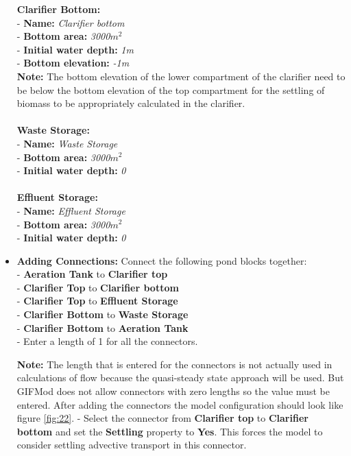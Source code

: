 \begin{itemize}
\textbf{Clarifier Bottom: }\\
- \textbf{Name: } \textit{Clarifier bottom} \\
- \textbf{Bottom area: }\textit{3000$m^2$} \\
- \textbf{Initial water depth: }\textit{1m} \\
- \textbf{Bottom elevation: }\textit{-1m}\\
\textbf{Note: } The bottom elevation of the lower compartment of the clarifier need to be below the bottom elevation of the top compartment for the settling of biomass to be appropriately calculated in the clarifier.\\\\ 
\textbf{Waste Storage: }\\
- \textbf{Name: } \textit{Waste Storage} \\
- \textbf{Bottom area: }\textit{3000$m^2$} \\
- \textbf{Initial water depth: }\textit{0} \\\\
\textbf{Effluent Storage: }\\
- \textbf{Name: } \textit{Effluent Storage} \\
- \textbf{Bottom area: }\textit{3000$m^2$} \\
- \textbf{Initial water depth: }\textit{0} \\
\item \textbf{Adding Connections: } Connect the following pond blocks together: \\
- \textbf{Aeration Tank} to \textbf{Clarifier top}\\
- \textbf{Clarifier Top} to \textbf{Clarifier bottom}\\
- \textbf{Clarifier Top} to \textbf{Effluent Storage}\\
- \textbf{Clarifier Bottom} to \textbf{Waste Storage}\\
- \textbf{Clarifier Bottom} to \textbf{Aeration Tank}\\
- Enter a length of 1 for all the connectors. 

\textbf{Note: } The length that is entered for the connectors is not actually used in calculations of flow because the quasi-steady state approach will be used. But GIFMod does not allow connectors with zero lengths so the value must be entered. After adding the connectors the model configuration should look like figure \ref{fig:22}.
- Select the connector from \textbf{Clarifier top} to \textbf{Clarifier bottom} and set the \textbf{Settling} property to \textbf{Yes}. This forces the model to consider settling advective transport in this connector. 


\end{itemize}

